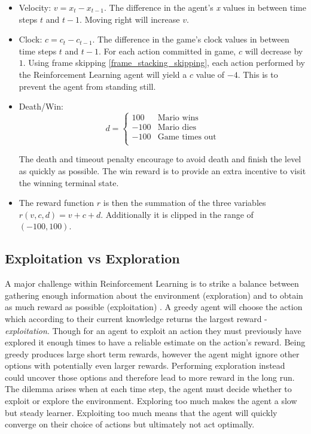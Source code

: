 \documentclass[notitlepage,a4paper,11pt]{article}
\begin{document}
\begin{itemize}

	\item Velocity: $v = x_t - x_{t-1}$. The difference in the agent's \textit{x} values in between time steps $t$ and $t - 1$. Moving right will increase $v$.
	
	\item Clock: $c = c_t - c_{t-1}$. The difference in the game's clock values in between time steps $t$ and $t - 1$. For each action committed in game, $c$ will decrease by $1$. Using frame skipping \ref{frame_stacking_skipping}, each action performed by the Reinforcement Learning agent will yield a $c$ value of $-4$. This is to prevent the agent from standing still.
	
	\item Death/Win: 
		\begin{equation*}
   	 		d = \begin{cases}
               			100               & \text{Mario wins}\\
               			-100              & \text{Mario dies}\\
               			-100				 & \text{Game times out}\\
           			\end{cases}
		\end{equation*}
		
		The death and timeout penalty encourage to avoid death and finish the level as quickly as possible. The win reward is to provide an extra incentive to visit the winning terminal state.
		
	\item The reward function $r$ is then the summation of the three variables $r(v, c, d) = v + c + d$. Additionally it is clipped in the range of $(-100, 100)$.
	
	
\end{itemize}


\subsection{Exploitation vs Exploration}
A major challenge within Reinforcement Learning is to strike a balance between gathering enough information about the environment (exploration) and to obtain as much reward as possible (exploitation) \cite{sutton2011reinforcement}. A greedy agent will choose the action which according to their current knowledge returns the largest reward - \textit{exploitation}. Though for an agent to exploit an action they must previously have explored it enough times to have a reliable estimate on the action's reward. Being greedy produces large short term rewards, however the agent might ignore other options with potentially even larger rewards. Performing exploration instead could uncover those options and therefore lead to more reward in the long run. The dilemma arises when at each time step, the agent must decide whether to exploit or explore the environment. Exploring too much makes the agent a slow but steady learner. Exploiting too much means that the agent will quickly converge on their choice of actions but ultimately not act optimally.
\end{document}
